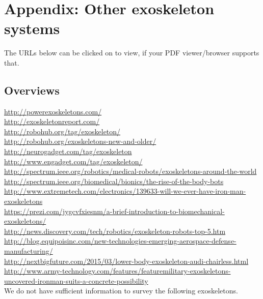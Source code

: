 
\section{Appendix: Other exoskeleton systems}

The URLs below can be clicked on to view, if your PDF viewer/browser supports that.

\subsection{Overviews}

\url{http://powerexoskeletons.com/}\\
\url{http://exoskeletonreport.com/}\\
\url{http://robohub.org/tag/exoskeleton/}\\
\url{http://robohub.org/exoskeletons-new-and-older/}\\
\url{http://neurogadget.com/tag/exoskeleton}\\
\url{http://www.engadget.com/tag/exoskeleton/}\\
\url{http://spectrum.ieee.org/robotics/medical-robots/exoskeletons-around-the-world}\\
\url{http://spectrum.ieee.org/biomedical/bionics/the-rise-of-the-body-bots}\\
\url{http://www.extremetech.com/electronics/139633-will-we-ever-have-iron-man-exoskeletons}\\
\url{https://prezi.com/jygcvfxiesnm/a-brief-introduction-to-biomechanical-exoskeletons/}\\
\url{http://news.discovery.com/tech/robotics/exoskeleton-robots-top-5.htm}\\
\url{http://blog.equipoisinc.com/new-technologies-emerging-aerospace-defense-manufacturing/}\\
\url{http://nextbigfuture.com/2015/03/lower-body-exoskeleton-audi-chairless.html}\\
\url{http://www.army-technology.com/features/featuremilitary-exoskeletons-uncovered-ironman-suits-a-concrete-possibility}\\


We do not have sufficient information to survey the following exoskeletons.


